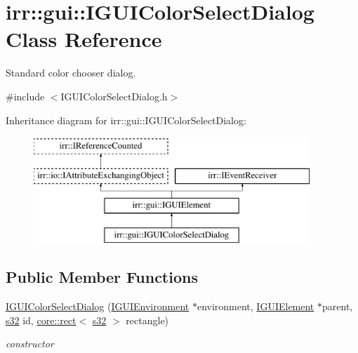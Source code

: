 \hypertarget{classirr_1_1gui_1_1IGUIColorSelectDialog}{}\section{irr\+:\+:gui\+:\+:I\+G\+U\+I\+Color\+Select\+Dialog Class Reference}
\label{classirr_1_1gui_1_1IGUIColorSelectDialog}


Standard color chooser dialog.  




{\ttfamily \#include $<$I\+G\+U\+I\+Color\+Select\+Dialog.\+h$>$}

Inheritance diagram for irr\+:\+:gui\+:\+:I\+G\+U\+I\+Color\+Select\+Dialog\+:\begin{figure}[H]
\begin{center}
\leavevmode
\includegraphics[height=4.000000cm]{classirr_1_1gui_1_1IGUIColorSelectDialog}
\end{center}
\end{figure}
\subsection*{Public Member Functions}
\begin{DoxyCompactItemize}
\item 
\mbox{\label{classirr_1_1gui_1_1IGUIColorSelectDialog_a67ac184f6dc90f74a2694015b02e3acd}} 
\hyperlink{classirr_1_1gui_1_1IGUIColorSelectDialog_a67ac184f6dc90f74a2694015b02e3acd}{I\+G\+U\+I\+Color\+Select\+Dialog} (\hyperlink{classirr_1_1gui_1_1IGUIEnvironment}{I\+G\+U\+I\+Environment} $\ast$environment, \hyperlink{classirr_1_1gui_1_1IGUIElement}{I\+G\+U\+I\+Element} $\ast$parent, \hyperlink{namespaceirr_ac66849b7a6ed16e30ebede579f9b47c6}{s32} id, \hyperlink{classirr_1_1core_1_1rect}{core\+::rect}$<$ \hyperlink{namespaceirr_ac66849b7a6ed16e30ebede579f9b47c6}{s32} $>$ rectangle)
\begin{DoxyCompactList}\small\item\em constructor \end{DoxyCompactList}\end{DoxyCompactItemize}
